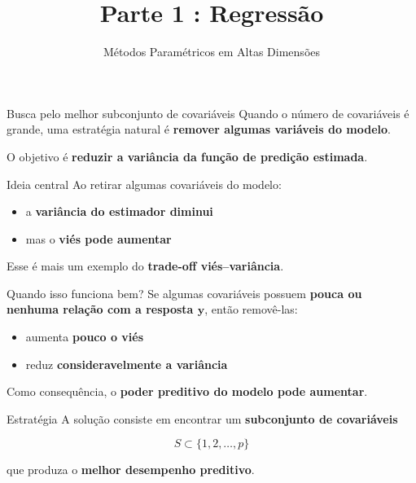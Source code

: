 \documentclass[
  ignorenonframetext,
  aspectratio=169,
]{beamer}
\title{Parte 1 : Regressão}
\subtitle{{Métodos Paramétricos em Altas Dimensões}}
\author{}
\date{}
\providecommand{\tightlist}{%
  \setlength{\itemsep}{0pt}\setlength{\parskip}{0pt}}
\begin{document}
\frame{\titlepage}


\begin{frame}{Busca pelo melhor subconjunto de covariáveis}
\label{busca-pelo-melhor-subconjunto-de-covariuxe1veis}
Quando o número de covariáveis é grande, uma estratégia natural é
\textbf{remover algumas variáveis do modelo}.

O objetivo é \textbf{reduzir a variância da função de predição
estimada}.

\begin{block}{Ideia central}
\label{ideia-central}
Ao retirar algumas covariáveis do modelo:

\begin{itemize}
\tightlist
\item
  a \textbf{variância do estimador diminui}
\item
  mas o \textbf{viés pode aumentar}
\end{itemize}

Esse é mais um exemplo do \textbf{trade-off viés--variância}.
\end{block}
\end{frame}

\begin{frame}
\begin{block}{Quando isso funciona bem?}
\label{quando-isso-funciona-bem}
Se algumas covariáveis possuem \textbf{pouca ou nenhuma relação com a
resposta \(\boldsymbol{y}\)}, então removê-las:

\begin{itemize}
\tightlist
\item
  aumenta \textbf{pouco o viés}
\item
  reduz \textbf{consideravelmente a variância}
\end{itemize}

Como consequência, o \textbf{poder preditivo do modelo pode aumentar}.
\end{block}
\end{frame}

\begin{frame}
\begin{block}{Estratégia}
\label{estratuxe9gia}
A solução consiste em encontrar um \textbf{subconjunto de covariáveis}

\[
S \subset \{1,2,\dots,p\}
\]

que produza o \textbf{melhor desempenho preditivo}.
\end{block}
\end{frame}
\end{document}
